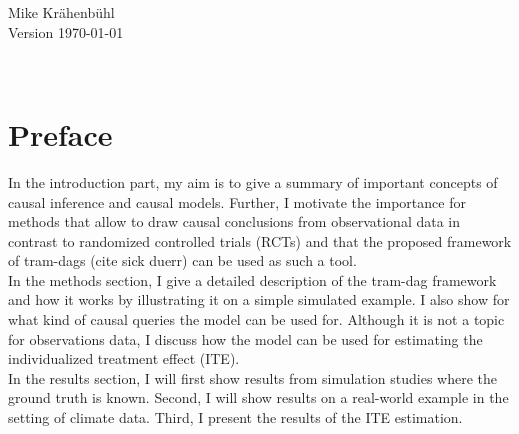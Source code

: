 \documentclass[11pt,a4paper,twoside]{book}
\begin{document}


\graphicspath{{./figure/}}
\setcounter{tocdepth}{1}

\thispagestyle{empty}
\begin{center}
  \vspace*{6cm}{\bfseries\Huge
  Neural Causal Models with TRAM-DAGs:\\[5mm]
  Applied on real-world data \\[5mm]
  and used for ITE estimation.
  }

  \vfill
  \rm

  \LARGE
  Mike Kr{\"a}henb{\"u}hl\\[12mm]
  
  \normalsize
  Version \today
\end{center}
\newpage
\thispagestyle{empty}~
\newpage
{}

\thispagestyle{plain}
\tableofcontents
{}

\chapter*{Preface}
\thispagestyle{plain}

In the introduction part, my aim is to give a summary of 
important concepts of causal inference and causal models. Further, 
I motivate the importance for methods that allow to draw causal 
conclusions from observational data in contrast to randomized controlled
trials (RCTs) and that the proposed framework of tram-dags (cite sick duerr)
 can be used as such a tool. \\ 
 
In the methods section, I give a detailed description of the tram-dag framework 
and how it works by illustrating it on a simple simulated example. 
I also show for what kind of causal queries the model can be used for. 
Although it is not a topic for observations data, I discuss how the model can be 
used for estimating the individualized treatment effect (ITE).\\ 

In the results section, I will first show results from simulation studies where the 
ground truth is known. Second, I will show results on a real-world example in the
setting of climate data. Third, I present the results of the ITE estimation. \\ 
\end{document}
